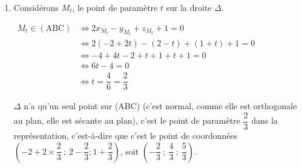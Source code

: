 \documentclass[10pt]{article}
\providecommand{\R}{\mathbb{R}}
\providecommand{\vect}[1]{\overrightarrow{#1}}
\begin{document}
\begin{enumerate}
\begin{enumerate}
 		Toute droite dirigée par $\vect{u}$, et donc $\Delta$, est donc orthogonale à (ABC).

 		\item $\vect{u}$ est donc un vecteur normal au plan (ABC), d'après la question précédente.

Par propriété, on en déduit qu'une équation de (ABC) est de la forme :

$2x - y + z + d = 0$\quad où $d$ est un réel.

 $\begin{aligned}
 \mathrm{A} \in (\mathrm{ABC})
 &\iff 2x_{\mathrm{A}} - y_{\mathrm{A}} + z_{\mathrm{A}} + d = 0\\
 &\iff 2\times 1 - 3 + 0 + d = 0\\
 &\iff -1 + d = 0\\
 &\iff d = 1
\end{aligned}$

Une équation de (ABC) est donc bien \quad $2x - y + z + 1 = 0$.

 		\item $\Delta$ contient $\mathrm{D}(-2~;~2~;~1)$ et est dirigée par $\vect{u}$, donc, par propriété, une représentation paramétrique de $\Delta$ est :\quad $\begin{cases}
 			x=-2 + 2t\\
 			y= 2 - t\\
 			z= 1 + t\\
 		\end{cases}$\quad avec $t \in \R$
	 \end{enumerate}
 \item Considérons $M_t$, le point de paramètre $t$ sur la droite $\Delta$.

 $\begin{aligned}
		M_t \in (\mathrm{ABC})
		&\iff 2x_{M_t} - y_{M_t} + z_{M_t} + 1 = 0\\
		&\iff 2(-2+2t) - (2 - t) + (1 + t) + 1 = 0\\
		&\iff -4 + 4t - 2 + t + 1 + t + 1 = 0\\
		&\iff 6t - 4 = 0\\
		&\iff t = \dfrac{4}{6} = \dfrac{2}{3}
 \end{aligned}$

$\Delta$ n'a qu'un seul point sur (ABC) (c'est normal, comme elle est orthogonale au plan, elle est sécante au plan), c'est le point de paramètre $\dfrac{2}{3}$ dans la représentation, c'est-à-dire que c'est le point de coordonnées $\left(-2 + 2\times \dfrac{2}{3}~;~2 - \dfrac{2}{3} ; 1 + \dfrac{2}{3}\right)$, soit $\left(-\dfrac{2}{3}~;~\dfrac{4}{3}~;~\dfrac{5}{3}\right)$.


\end{enumerate}
\end{document}
